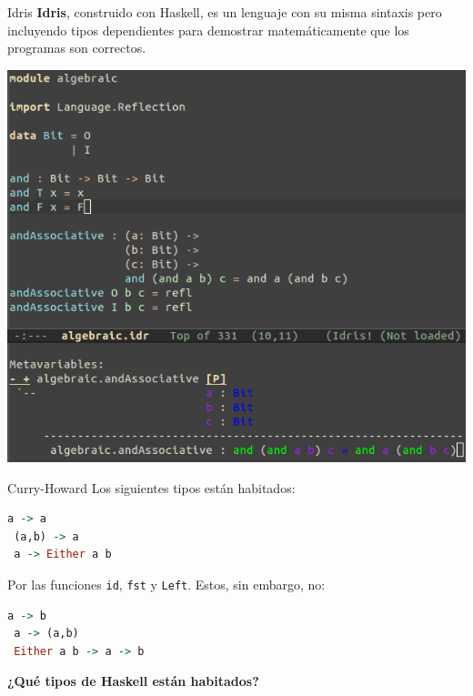 \begin{frame}[fragile]{Idris}
  \textbf{Idris}, construido con Haskell, es un lenguaje
  con su misma sintaxis pero incluyendo tipos dependientes
  para demostrar matemáticamente que los programas son correctos.

  \begin{center}
  \includegraphics[scale=0.28]{./images/idris.png}
  \end{center}
\end{frame}


\begin{frame}[fragile]{Curry-Howard}
 Los siguientes tipos están habitados:
 \begin{lstlisting}[language=haskell]
 a -> a
 (a,b) -> a
 a -> Either a b
 \end{lstlisting}
 Por las funciones \texttt{id}, \texttt{fst} y \texttt{Left}.
 Estos, sin embargo, no:
 \begin{lstlisting}[language=haskell]
 a -> b
 a -> (a,b)
 Either a b -> a -> b
 \end{lstlisting}

 \textbf{¿Qué tipos de Haskell están habitados?}

\end{frame}


